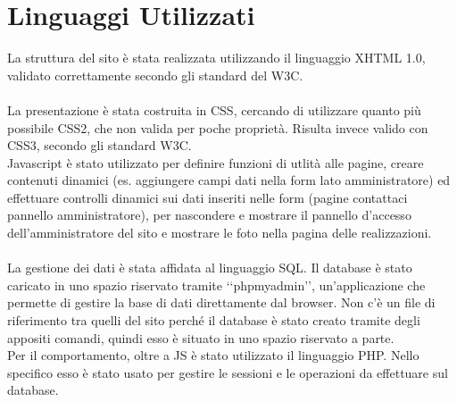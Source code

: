 \section{Linguaggi Utilizzati}{
	La struttura del sito è stata realizzata utilizzando il linguaggio XHTML 1.0, validato correttamente secondo gli standard del W3C. \\
	\\
	La presentazione è stata costruita in CSS, cercando di utilizzare quanto più possibile CSS2, che non valida per poche proprietà. Risulta invece valido con CSS3, secondo gli standard W3C.
	\\
	Javascript è stato utilizzato per definire funzioni di utlità alle pagine, creare contenuti dinamici (es. aggiungere campi dati nella form lato amministratore) ed effettuare controlli dinamici sui dati inseriti nelle form (pagine contattaci pannello amministratore), per nascondere e mostrare il pannello d'accesso dell'amministratore del sito e mostrare le foto nella pagina delle realizzazioni.\\
	\\
	La gestione dei dati è stata affidata al linguaggio SQL. Il database è stato caricato in uno spazio riservato tramite ‘‘phpmyadmin’’, un'applicazione che permette di gestire la base di dati direttamente dal browser. Non c'è un file di riferimento tra quelli del sito perché il database è stato creato tramite degli appositi comandi, quindi esso è situato in uno spazio riservato a parte.
	\\
	Per il comportamento, oltre a JS è stato utilizzato il linguaggio PHP. Nello specifico esso è stato usato per gestire le sessioni e le operazioni da effettuare sul database.
	\\
}